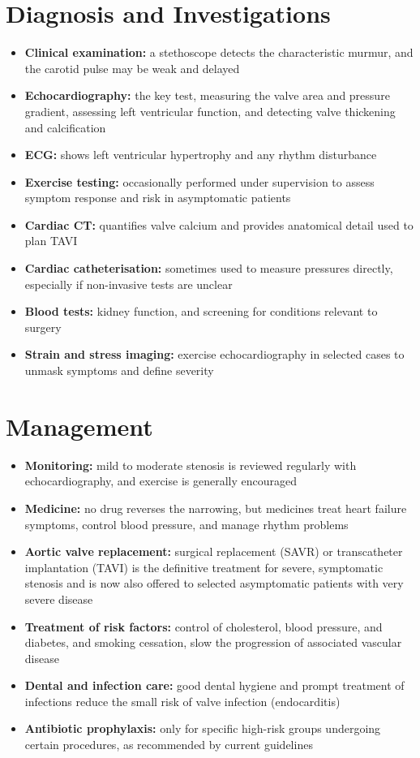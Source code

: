 \section*{Diagnosis and Investigations}
\begin{itemize}
    \item \textbf{Clinical examination:} a stethoscope detects the characteristic murmur, and the carotid pulse may be weak and delayed
    \item \textbf{Echocardiography:} the key test, measuring the valve area and pressure gradient, assessing left ventricular function, and detecting valve thickening and calcification
    \item \textbf{ECG:} shows left ventricular hypertrophy and any rhythm disturbance
    \item \textbf{Exercise testing:} occasionally performed under supervision to assess symptom response and risk in asymptomatic patients
    \item \textbf{Cardiac CT:} quantifies valve calcium and provides anatomical detail used to plan TAVI
    \item \textbf{Cardiac catheterisation:} sometimes used to measure pressures directly, especially if non-invasive tests are unclear
    \item \textbf{Blood tests:} kidney function, and screening for conditions relevant to surgery
    \item \textbf{Strain and stress imaging:} exercise echocardiography in selected cases to unmask symptoms and define severity
\end{itemize}

\section*{Management}
\begin{itemize}
    \item \textbf{Monitoring:} mild to moderate stenosis is reviewed regularly with echocardiography, and exercise is generally encouraged
    \item \textbf{Medicine:} no drug reverses the narrowing, but medicines treat heart failure symptoms, control blood pressure, and manage rhythm problems
    \item \textbf{Aortic valve replacement:} surgical replacement (SAVR) or transcatheter implantation (TAVI) is the definitive treatment for severe, symptomatic stenosis and is now also offered to selected asymptomatic patients with very severe disease
    \item \textbf{Treatment of risk factors:} control of cholesterol, blood pressure, and diabetes, and smoking cessation, slow the progression of associated vascular disease
    \item \textbf{Dental and infection care:} good dental hygiene and prompt treatment of infections reduce the small risk of valve infection (endocarditis)
    \item \textbf{Antibiotic prophylaxis:} only for specific high-risk groups undergoing certain procedures, as recommended by current guidelines
\end{itemize}

